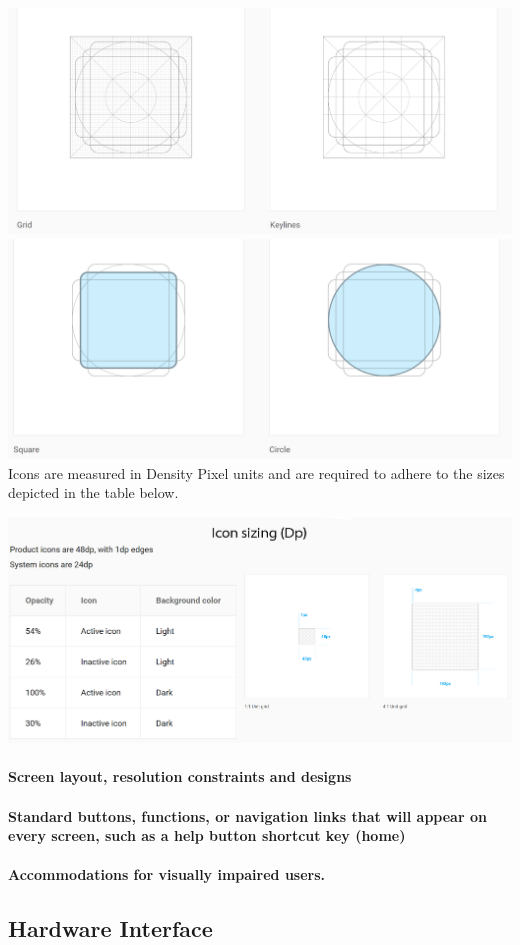 \documentclass[11pt]{article}
\begin{document}
	\includegraphics[width=0.5\linewidth]{Images/gird.png}\\[1cm]
	\newline
	\includegraphics[width=0.5\linewidth]{Images/gird2.png}\\[1cm]
	
	Icons are measured in Density Pixel units and are required to adhere to the sizes depicted in the table below. \newline
	
		\includegraphics[width=0.5\linewidth]{Images/iconSizes.png}\\[1cm]
	
	\paragraph{Screen layout, resolution constraints and designs}
	\paragraph{Standard buttons, functions, or navigation links that will appear on every screen, such as a help button shortcut key (home)}
	\paragraph{Accommodations for visually impaired users.}	
	\subsection{Hardware Interface}
\end{document}
